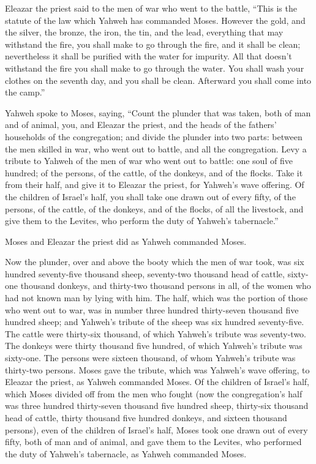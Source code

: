  Eleazar the priest said to the men of war who went to
the battle, ``This is the statute of the law which Yahweh has commanded
Moses.  However the gold, and the silver, the bronze, the
iron, the tin, and the lead,  everything that may
withstand the fire, you shall make to go through the fire, and it shall
be clean; nevertheless it shall be purified with the water for impurity.
All that doesn't withstand the fire you shall make to go through the
water.  You shall wash your clothes on the seventh day,
and you shall be clean. Afterward you shall come into the camp.''

 Yahweh spoke to Moses, saying,  ``Count
the plunder that was taken, both of man and of animal, you, and Eleazar
the priest, and the heads of the fathers' households of the
congregation;  and divide the plunder into two parts:
between the men skilled in war, who went out to battle, and all the
congregation.  Levy a tribute to Yahweh of the men of war
who went out to battle: one soul of five hundred; of the persons, of the
cattle, of the donkeys, and of the flocks.  Take it from
their half, and give it to Eleazar the priest, for Yahweh's wave
offering.  Of the children of Israel's half, you shall
take one drawn out of every fifty, of the persons, of the cattle, of the
donkeys, and of the flocks, of all the livestock, and give them to the
Levites, who perform the duty of Yahweh's tabernacle.''

 Moses and Eleazar the priest did as Yahweh commanded
Moses.

 Now the plunder, over and above the booty which the men
of war took, was six hundred seventy-five thousand sheep,
 seventy-two thousand head of cattle, 
sixty-one thousand donkeys,  and thirty-two thousand
persons in all, of the women who had not known man by lying with him.
 The half, which was the portion of those who went out to
war, was in number three hundred thirty-seven thousand five hundred
sheep;  and Yahweh's tribute of the sheep was six hundred
seventy-five.  The cattle were thirty-six thousand, of
which Yahweh's tribute was seventy-two.  The donkeys were
thirty thousand five hundred, of which Yahweh's tribute was sixty-one.
 The persons were sixteen thousand, of whom Yahweh's
tribute was thirty-two persons.  Moses gave the tribute,
which was Yahweh's wave offering, to Eleazar the priest, as Yahweh
commanded Moses.  Of the children of Israel's half, which
Moses divided off from the men who fought  (now the
congregation's half was three hundred thirty-seven thousand five hundred
sheep,  thirty-six thousand head of cattle,
 thirty thousand five hundred donkeys, 
and sixteen thousand persons),  even of the children of
Israel's half, Moses took one drawn out of every fifty, both of man and
of animal, and gave them to the Levites, who performed the duty of
Yahweh's tabernacle, as Yahweh commanded Moses.


